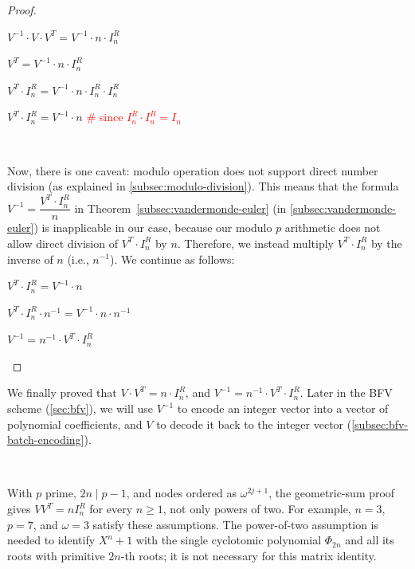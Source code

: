 \begin{proof}
\begin{enumerate}
$V^{-1} \cdot V \cdot V^T = V^{-1} \cdot n \cdot I_n^R$

$V^T = V^{-1} \cdot n \cdot I_n^R$

$V^T \cdot I_n^R = V^{-1} \cdot n \cdot I_n^R  \cdot I_n^R$

$V^T \cdot I_n^R = V^{-1} \cdot n$ \textcolor{red}{\text{ } \# since $I_n^R  \cdot I_n^R = I_n$}

$ $

Now, there is one caveat: modulo operation does not support direct number division (as explained in \autoref{subsec:modulo-division}). This means that the formula $V^{-1} = \dfrac{V^T \cdot I_n^R}{n}$ in Theorem~\ref*{subsec:vandermonde-euler} (in \autoref{subsec:vandermonde-euler}) is inapplicable in our case, because our modulo $p$ arithmetic does not allow direct division of $V^T \cdot I_n^R$ by $n$. Therefore, we instead multiply $V^T \cdot I_n^R$ by the inverse of $n$ (i.e., $n^{-1}$). We continue as follows:

$V^T \cdot I_n^R = V^{-1} \cdot n$

$V^T \cdot I_n^R \cdot n^{-1}= V^{-1} \cdot n \cdot n^{-1}$

$V^{-1} = n^{-1}\cdot V^T \cdot I_n^R$

\end{enumerate}
\end{proof}

We finally proved that $V\cdot V^T = n \cdot I_n^R$, and $V^{-1} = n^{-1}\cdot V^T \cdot I_n^R$. Later in the BFV scheme (\autoref{sec:bfv}), we will use $V^{-1}$ to encode an integer vector into a vector of polynomial coefficients, and $V$ to decode it back to the integer vector (\autoref{subsec:bfv-batch-encoding}).

$ $

 With $p$ prime, $2n\mid p-1$, and nodes ordered as $\omega^{2j+1}$, the geometric-sum proof gives $V V^T=n I_n^R$ for every $n\ge1$, not only powers of two. For example, $n=3$, $p=7$, and $\omega=3$ satisfy these assumptions. The power-of-two assumption is needed to identify $X^n+1$ with the single cyclotomic polynomial $\Phi_{2n}$ and all its roots with primitive $2n$-th roots; it is not necessary for this matrix identity.
